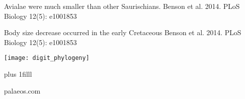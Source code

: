 \documentclass[t]{beamer}
\begin{document}
{
\begin{frame}[b,plain]{Avialae were much smaller than other Saurischians.}
	\tiny Benson et al. 2014. PLoS Biology 12(5): e1001853
\end{frame}
}

{
\begin{frame}[b,plain]{Body size decrease occurred in the early Cretaceous}
	\tiny Benson et al. 2014. PLoS Biology 12(5): e1001853
\end{frame}
}
%
%

%
%	
%
%	
%	
%	

{
\begin{frame}[t,plain]
	\begin{center}
		\texttt{[image: digit\_phylogeny]}
	\end{center}
	
	\vskip0pt plus 1filll
	
	\tiny\hfill palaeos.com
\end{frame}
}
\end{document}
